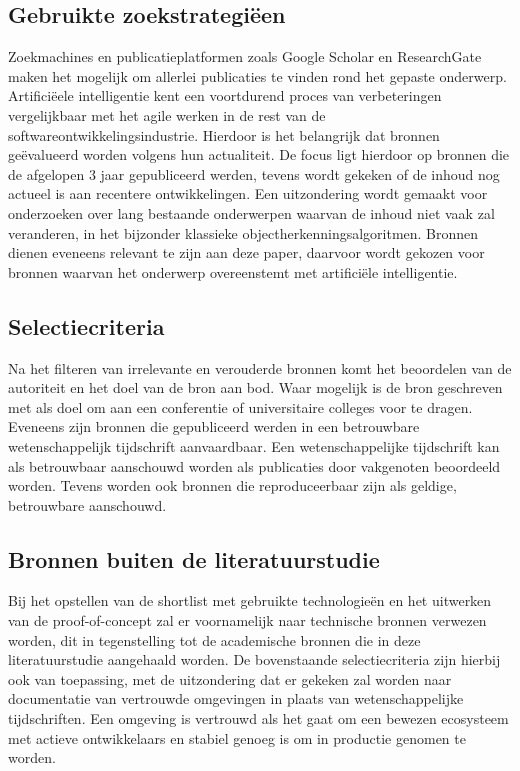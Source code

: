 \subsection{Gebruikte zoekstrategiëen}
\label{subsec:zoekstrategieen}
Zoekmachines en publicatieplatformen zoals Google Scholar en ResearchGate maken het mogelijk om allerlei publicaties te vinden rond het gepaste onderwerp.
Artifici\"eele intelligentie kent een voortdurend proces van verbeteringen vergelijkbaar met het agile werken in de rest van de softwareontwikkelingsindustrie.
Hierdoor is het belangrijk dat bronnen ge\"evalueerd worden volgens hun actualiteit.
De focus ligt hierdoor op bronnen die de afgelopen 3 jaar gepubliceerd werden, tevens wordt gekeken of de inhoud nog actueel is aan recentere ontwikkelingen.
Een uitzondering wordt gemaakt voor onderzoeken over lang bestaande onderwerpen waarvan de inhoud niet vaak zal veranderen, in het bijzonder klassieke objectherkenningsalgoritmen.
Bronnen dienen eveneens relevant te zijn aan deze paper, daarvoor wordt gekozen voor bronnen waarvan het onderwerp overeenstemt met artifici\"ele intelligentie.

\subsection{Selectiecriteria}
\label{subsec:selectiecriteria}
Na het filteren van irrelevante en verouderde bronnen komt het beoordelen van de autoriteit en het doel van de bron aan bod.
Waar mogelijk is de bron geschreven met als doel om aan een conferentie of universitaire colleges voor te dragen.
Eveneens zijn bronnen die gepubliceerd werden in een betrouwbare wetenschappelijk tijdschrift aanvaardbaar.
Een wetenschappelijke tijdschrift kan als betrouwbaar aanschouwd worden als publicaties door vakgenoten beoordeeld worden.
Tevens worden ook bronnen die reproduceerbaar zijn als geldige, betrouwbare aanschouwd.

\subsection{Bronnen buiten de literatuurstudie}
\label{subsec:bronnen-buiten-de-literatuurstudie}
Bij het opstellen van de shortlist met gebruikte technologie\"en en het uitwerken van de proof-of-concept zal er voornamelijk naar technische bronnen verwezen worden, dit in tegenstelling tot de academische bronnen die in deze literatuurstudie aangehaald worden.
De bovenstaande selectiecriteria zijn hierbij ook van toepassing, met de uitzondering dat er gekeken zal worden naar documentatie van vertrouwde omgevingen in plaats van wetenschappelijke tijdschriften.
Een omgeving is vertrouwd als het gaat om een bewezen ecosysteem met actieve ontwikkelaars en stabiel genoeg is om in productie genomen te worden.

